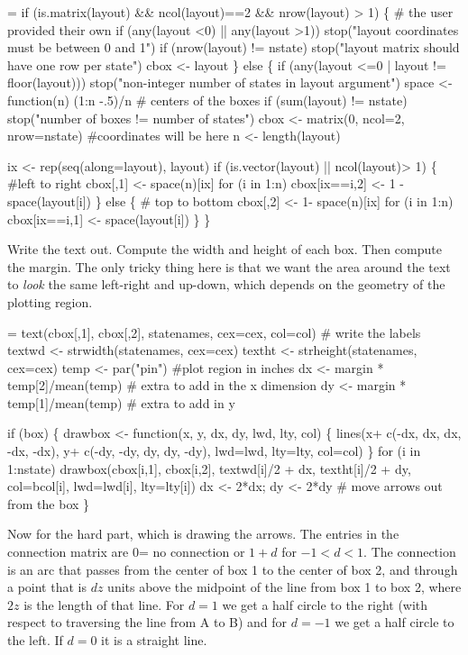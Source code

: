 \documentclass{article}
\begin{document}
\begin{nwchunk}
=
 if (is.matrix(layout) && ncol(layout)==2 && nrow(layout) > 1) \{
     # the user provided their own
     if (any(layout <0) || any(layout >1))
         stop("layout coordinates must be between 0 and 1")
     if (nrow(layout) != nstate)
         stop("layout matrix should have one row per state")
     cbox <- layout
 \}
 else \{
     if (any(layout <=0 | layout != floor(layout)))
         stop("non-integer number of states in layout argument")
     space <- function(n) (1:n -.5)/n   # centers of the boxes
     if (sum(layout) != nstate) stop("number of boxes != number of states")
     cbox <- matrix(0, ncol=2, nrow=nstate)  #coordinates will be here
     n <- length(layout)
  
     ix <- rep(seq(along=layout), layout) 
     if (is.vector(layout) || ncol(layout)> 1) \{ #left to right     
         cbox[,1] <- space(n)[ix]
         for (i in 1:n) cbox[ix==i,2] <- 1 -space(layout[i])
     \} else \{ # top to bottom
         cbox[,2] <- 1- space(n)[ix]
         for (i in 1:n) cbox[ix==i,1] <- space(layout[i])
     \}
 \}
\end{nwchunk}

Write the text out.  Compute the width and height of each box.
Then compute the margin.  The only tricky thing here is that we want
the area around the text to \emph{look} the same left-right and up-down,
which depends on the geometry of the plotting region.  

\begin{nwchunk}
=
 text(cbox[,1], cbox[,2], statenames, cex=cex, col=col)  # write the labels
 textwd <- strwidth(statenames, cex=cex)
 textht <- strheight(statenames, cex=cex)
 temp <- par("pin")   #plot region in inches
 dx <- margin * temp[2]/mean(temp)  # extra to add in the x dimension
 dy <- margin * temp[1]/mean(temp)  # extra to add in y
 
 if (box) \{
     drawbox <- function(x, y, dx, dy, lwd, lty, col) \{
         lines(x+ c(-dx, dx, dx, -dx, -dx),
               y+ c(-dy, -dy, dy, dy, -dy), lwd=lwd, lty=lty, col=col)
     \}
     for (i in 1:nstate) 
         drawbox(cbox[i,1], cbox[i,2], textwd[i]/2 + dx, textht[i]/2 + dy,
                 col=bcol[i], lwd=lwd[i], lty=lty[i])
     dx <- 2*dx; dy <- 2*dy   # move arrows out from the box
     \}
\end{nwchunk}

Now for the hard part, which is drawing the arrows.
The entries in the connection matrix are 0= no connection or $1+d$ for
$-1 < d < 1$.  The connection is an arc that passes from the center of
box 1 to the center of box 2, and through a point that is $dz$ units above
the midpoint of the line from box 1 to box 2, where $2z$ is the length
of that line.
For $d=1$ we get a half circle to the right (with respect to traversing the
line from A to B) and for $d= -1$ we get a half circle to the left.
If $d=0$ it is a straight line.
\end{document}
